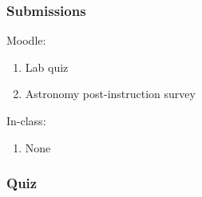 \documentclass[12pt]{article}
\begin{document}
\subsubsection{Submissions}

Moodle:
\begin{enumerate}
\item Lab quiz
\item Astronomy post-instruction survey
\end{enumerate}

\noindent
In-class:
\begin{enumerate}
\item None
\end{enumerate}


\subsubsection{Quiz}
\end{document}
